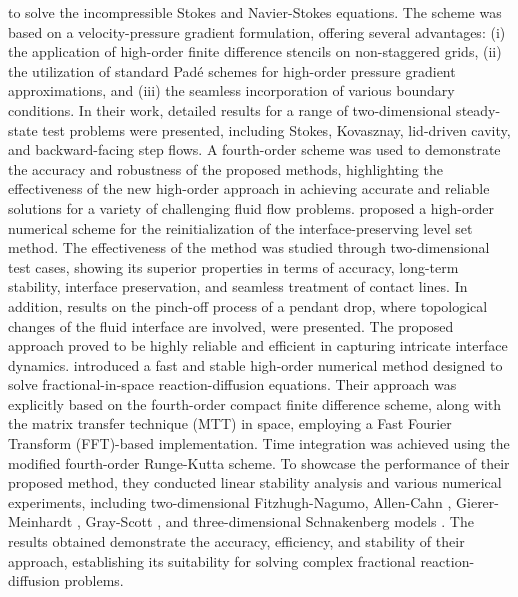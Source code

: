 \documentclass[preprint, 12pt]{elsarticle}
\begin{document}
to solve the incompressible Stokes and Navier-Stokes equations. The scheme was
based on a velocity-pressure gradient formulation, offering several advantages:
(i) the application of high-order finite difference stencils on non-staggered
grids, (ii) the utilization of standard Padé schemes for high-order pressure
gradient approximations, and (iii) the seamless incorporation of various
boundary conditions. In their work, detailed results for a range of
two-dimensional steady-state test problems were presented, including Stokes,
Kovasznay, lid-driven cavity, and backward-facing step flows. A fourth-order
scheme was used to demonstrate the accuracy and robustness of the proposed
methods, highlighting the effectiveness of the new high-order approach in
achieving accurate and reliable solutions for a variety of challenging fluid
flow problems. \citet{ZHANG2019634}  proposed a high-order numerical scheme for
the reinitialization of the interface-preserving level set method. The
effectiveness of the method was studied through two-dimensional test cases,
showing its superior properties in terms of accuracy, long-term stability,
interface preservation, and seamless treatment of contact lines. In addition,
results on the pinch-off process of a pendant drop, where topological changes
of the fluid interface are involved, were presented. The proposed approach
proved to be highly reliable and efficient in capturing intricate interface
dynamics. \citet{ALMUSHAIRA2021235} introduced a fast and stable high-order
numerical method designed to solve fractional-in-space reaction-diffusion
equations. Their approach was explicitly based on the fourth-order compact
finite difference scheme, along with the matrix transfer technique (MTT) in
space, employing a Fast Fourier Transform (FFT)-based implementation. Time
integration was achieved using the modified fourth-order Runge-Kutta scheme. To
showcase the performance of their proposed method, they conducted linear
stability analysis and various numerical experiments, including two-dimensional
Fitzhugh-Nagumo, Allen-Cahn \citep{Allen1972}, Gierer-Meinhardt
\citep{Gierer1972}, Gray-Scott \citep{Gray1984}, and three-dimensional
Schnakenberg models \citep{Schnakenberg1979}. The results obtained demonstrate
the accuracy, efficiency, and stability of their approach, establishing its
suitability for solving complex fractional reaction-diffusion problems.
\end{document}
